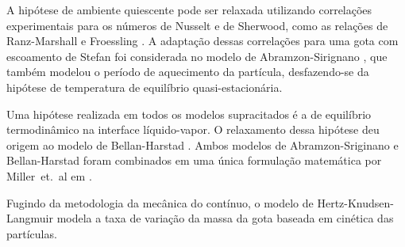 A hipótese de ambiente quiescente pode ser relaxada utilizando correlações experimentais para os números de Nusselt e de Sherwood, como as relações de Ranz-Marshall e Froessling \cite{Bird2002}. 
A adaptação dessas correlações para uma gota com escoamento de Stefan foi considerada no modelo de Abramzon-Sirignano \cite{Sirignano1989}, que também modelou o período de aquecimento da partícula, desfazendo-se da hipótese de temperatura de equilíbrio quasi-estacionária.

Uma hipótese realizada em todos os modelos supracitados é a de equilíbrio termodinâmico na interface líquido-vapor.
O relaxamento dessa hipótese deu origem ao modelo de Bellan-Harstad \cite{BellanJ1987}.
Ambos modelos de Abramzon-Sriginano e Bellan-Harstad foram combinados em uma única formulação matemática por Miller~et.~al em \cite{MillerR1998}.

Fugindo da metodologia da mecânica do contínuo, o modelo de Hertz-Knudsen-Langmuir  modela a taxa de variação da massa da gota baseada em cinética das partículas.

